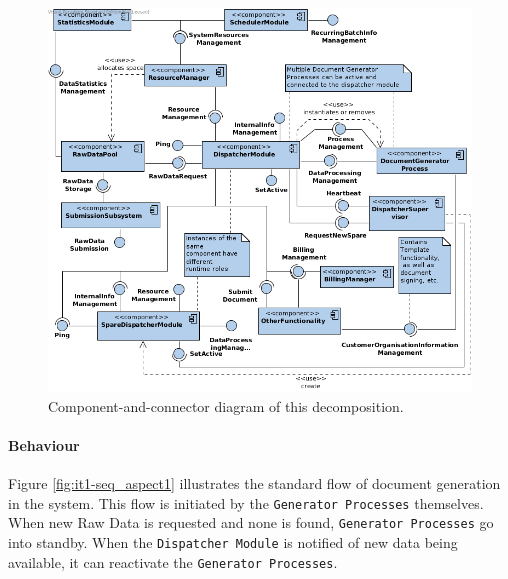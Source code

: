 \documentclass[a4paper,10pt]{article}
\begin{document}
\begin{figure}[!htp]
    \centering
    \includegraphics[width=\textwidth]{comp_diag_1.png}
    \caption{Component-and-connector diagram of this decomposition.}\label{fig:it1-cc_main}
\end{figure}

\paragraph{Behaviour}
Figure \ref{fig:it1-seq_aspect1} illustrates the standard flow of document generation in the system. This flow is initiated by the \texttt{Generator Processes} themselves. When new Raw Data is requested and none is found, \texttt{Generator Processes} go into standby. When the \texttt{Dispatcher Module} is notified of new data being available, it can reactivate the \texttt{Generator Processes}.
\end{document}
